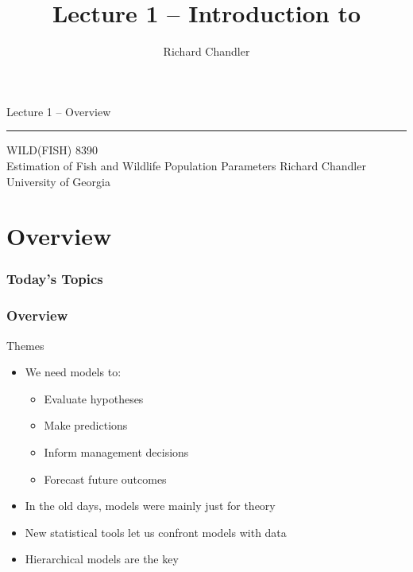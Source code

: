 \documentclass[color=usenames,dvipsnames]{beamer}\usepackage[]{graphicx}\usepackage[]{color}
\title{Lecture 1 -- Introduction to }
\author{Richard Chandler}
\begin{document}



\begin{frame}[plain]
  \LARGE
  \centering
  {\huge %
    Lecture 1 -- Overview} \\
  {\color{default} \rule{\textwidth}{0.1pt}}
  \vfill
  \large
  WILD(FISH) 8390 \\
  Estimation of Fish and Wildlife Population Parameters
  \vfill
  Richard Chandler \\
  University of Georgia \\
\end{frame}




\section{Overview}


\begin{frame}[plain]
  \frametitle{Today's Topics}
  \Large
\end{frame}



\begin{frame}
  \frametitle{Overview}
  {\Large Themes}
  \begin{itemize}
    \item<2-> We need models to:
      \begin{itemize}
        \item Evaluate hypotheses
        \item Make predictions
        \item Inform management decisions
        \item Forecast future outcomes
      \end{itemize}
    \item<3-> In the old days, models were mainly just for theory
    \item<4-> New statistical tools let us confront models with data
    \item<5-> Hierarchical models are the key
  \end{itemize}
\end{frame}
\end{document}
